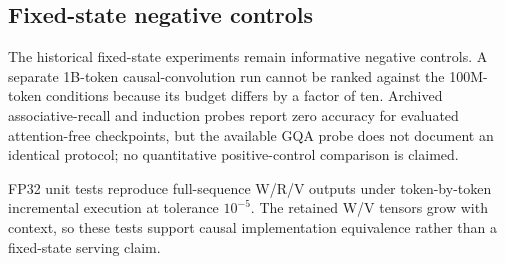\subsection{Fixed-state negative controls}

The historical fixed-state experiments remain informative negative controls. A separate 1B-token causal-convolution run cannot be ranked against the 100M-token conditions because its budget differs by a factor of ten. Archived associative-recall and induction probes report zero accuracy for evaluated attention-free checkpoints, but the available GQA probe does not document an identical protocol; no quantitative positive-control comparison is claimed.

FP32 unit tests reproduce full-sequence W/R/V outputs under token-by-token incremental execution at tolerance $10^{-5}$. The retained W/V tensors grow with context, so these tests support causal implementation equivalence rather than a fixed-state serving claim.